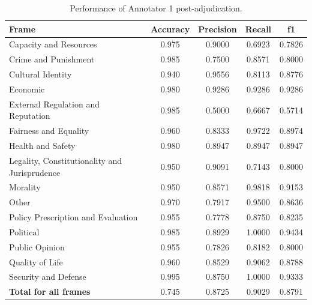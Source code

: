 \documentclass[
10pt, %
a4paper, %
oneside, %
headinclude,footinclude, %
] {book}%
\begin{document}
\begin{table}[htbp]
\small
\centering
\begin{tabular}{|l|c|c|c|c|}
\hline
\textbf{Frame} & \textbf{Accuracy} & \textbf{Precision} & \textbf{Recall} & \textbf{f1} \\
\hline
Capacity and Resources & 0.975 & 0.9000 & 0.6923 & 0.7826 \\\hline
Crime and Punishment & 0.985 & 0.7500 & 0.8571 & 0.8000 \\\hline
Cultural Identity & 0.940 & 0.9556 & 0.8113 & 0.8776 \\\hline
Economic & 0.980 & 0.9286 & 0.9286 & 0.9286 \\\hline
External Regulation and Reputation & 0.985 & 0.5000 & 0.6667 & 0.5714 \\\hline
Fairness and Equality & 0.960 & 0.8333 & 0.9722 & 0.8974 \\\hline
Health and Safety & 0.980 & 0.8947 & 0.8947 & 0.8947 \\\hline
Legality, Constitutionality and Jurisprudence & 0.950 & 0.9091 & 0.7143 & 0.8000 \\\hline
Morality & 0.950 & 0.8571 & 0.9818 & 0.9153 \\\hline
Other & 0.970 & 0.7917 & 0.9500 & 0.8636 \\\hline
Policy Prescription and Evaluation & 0.955 & 0.7778 & 0.8750 & 0.8235 \\\hline
Political & 0.985 & 0.8929 & 1.0000 & 0.9434 \\\hline
Public Opinion & 0.955 & 0.7826 & 0.8182 & 0.8000 \\\hline
Quality of Life & 0.960 & 0.8529 & 0.9062 & 0.8788 \\\hline
Security and Defense & 0.995 & 0.8750 & 1.0000 & 0.9333 \\
\hline
\textbf{Total for all frames} & 0.745 & 0.8725 & 0.9029 & 0.8791 \\
\hline
\end{tabular}
\caption{Performance of Annotator 1 post-adjudication.}
\label{tab:post_annotator1_performance}
\end{table}

\newpage
\end{document}
